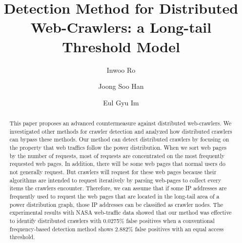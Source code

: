 \documentclass[sigconf,review]{acmart}
\begin{document}
\title{Detection Method for Distributed Web-Crawlers: a Long-tail Threshold Model}

\author{Inwoo Ro}

\author{Joong Soo Han}

\author{Eul Gyu Im}

\renewcommand{\shortauthors}{I. Ro et al.}


\begin{abstract}
This paper proposes an advanced countermeasure against distributed web-crawlers. We investigated other methods for crawler detection and analyzed how distributed crawlers can bypass these methods.  Our method can detect distributed crawlers by focusing on the property that web traffics follow the power distribution. When we sort web pages by the number of requests, most of requests are concentrated on the most frequently requested web pages. In addition, there will be some web pages that normal users do not generally request. But crawlers will request for these web pages because their algorithms are intended to request iteratively by parsing web-pages to collect every items the crawlers encounter. Therefore, we can assume that if some IP addresses are frequently used to request the web pages that are located in the long-tail area of a power distribution graph, those IP addresses can be classified as crawler nodes. The experimental results with NASA web-traffic data showed that our method was effective to identify distributed crawlers with 0.0275\% false positives when a conventional frequency-based detection method shows 2.882\% false positives with an equal access threshold.
\end{abstract}



\maketitle
\end{document}
